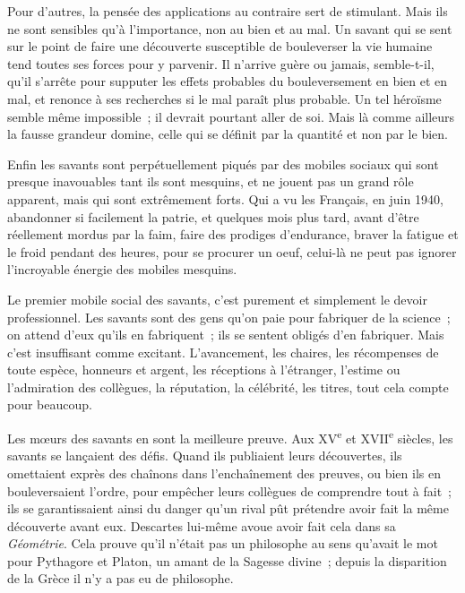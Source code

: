 \documentclass[french,twoside]{book} %
\begin{document}
Pour d'autres, la pensée des applications au contraire sert de stimulant. Mais ils ne sont sensibles qu'à l'importance, non au bien et au mal. Un savant qui se sent sur le point de faire une découverte susceptible de bouleverser la vie humaine tend toutes ses forces pour y parvenir. Il n'arrive guère ou jamais, semble-t-il, qu'il s'arrête pour supputer les effets probables du bouleversement en bien et en mal, et renonce à ses recherches si le mal paraît plus probable. Un tel héroïsme semble même impossible ; il devrait pourtant aller de soi. Mais là comme ailleurs la fausse grandeur domine, celle qui se définit par la quantité et non par le bien.\par
Enfin les savants sont perpétuellement piqués par des mobiles sociaux qui sont presque inavouables tant ils sont mesquins, et ne jouent pas un grand rôle apparent, mais qui sont extrêmement forts. Qui a vu les Français, en juin 1940, abandonner si facilement la patrie, et quelques mois plus tard, avant d'être réellement mordus par la faim, faire des prodiges d'endurance, braver la fatigue et le froid pendant des heures, pour se procurer un oeuf, celui-là ne peut pas ignorer l'incroyable énergie des mobiles mesquins.\par
Le premier mobile social des savants, c'est purement et simplement le devoir professionnel. Les savants sont des gens qu'on paie pour fabriquer de la science ; on attend d'eux qu'ils en fabriquent ; ils se sentent obligés d'en fabriquer. Mais c'est insuffisant comme excitant. L'avancement, les chaires, les récompenses de toute espèce, honneurs et argent, les réceptions à l'étranger, l'estime ou l'admiration des collègues, la réputation, la célébrité, les titres, tout cela compte pour beaucoup.\par
Les mœurs des savants en sont la meilleure preuve. Aux XV\textsuperscript{e} et XVII\textsuperscript{e} siècles, les savants se lançaient des défis. Quand ils publiaient leurs découvertes, ils omettaient exprès des chaînons dans l'enchaînement des preuves, ou bien ils en bouleversaient l'ordre, pour empêcher leurs collègues de comprendre tout à fait ; ils se garantissaient ainsi du danger qu'un rival pût prétendre avoir fait la même découverte avant eux. Descartes lui-même avoue avoir fait cela dans sa {\itshape Géométrie}. Cela prouve qu'il n'était pas un philosophe au sens qu'avait le mot pour Pythagore et Platon, un amant de la Sagesse divine ; depuis la disparition de la Grèce il n'y a pas eu de philosophe.\par
\end{document}
